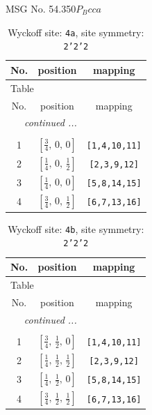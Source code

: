 \documentclass[fleqn,8pt]{jsarticle}
\begin{document}
\setcounter{MaxMatrixCols}{32}

\renewcommand{\tablename}{Table~}
\renewcommand{\figurename}{Figure~}
\begin{center}
\LARGE
MSG No. 54.350\quad$P_{B}cca$
\end{center}
\renewcommand{\arraystretch}{1.2}
\begin{longtable}{ccc}
\caption{Wyckoff site: {\tt 4a}, site symmetry: {\tt 2'2'2}}
 \\
 \hline \hline
No. & position & mapping \\ \hline \endfirsthead

\multicolumn{2}{l}{\tablename\ \thetable{}} \\
 \hline \hline
No. & position & mapping \\ \hline \endhead

 \hline \hline
\multicolumn{2}{r}{\footnotesize\it continued ...} \\ \endfoot

 \hline \hline
\multicolumn{2}{r}{} \\ \endlastfoot

1 & $\left[ \frac{3}{4},\, 0,\, 0 \right]$ & {\tt [1,4,10,11]} \\ \hline
2 & $\left[ \frac{1}{4},\, 0,\, \frac{1}{2} \right]$ & {\tt [2,3,9,12]} \\ \hline
3 & $\left[ \frac{1}{4},\, 0,\, 0 \right]$ & {\tt [5,8,14,15]} \\ \hline
4 & $\left[ \frac{3}{4},\, 0,\, \frac{1}{2} \right]$ & {\tt [6,7,13,16]} \\
\end{longtable}
\renewcommand{\arraystretch}{1.2}
\begin{longtable}{ccc}
\caption{Wyckoff site: {\tt 4b}, site symmetry: {\tt 2'2'2}}
 \\
 \hline \hline
No. & position & mapping \\ \hline \endfirsthead

\multicolumn{2}{l}{\tablename\ \thetable{}} \\
 \hline \hline
No. & position & mapping \\ \hline \endhead

 \hline \hline
\multicolumn{2}{r}{\footnotesize\it continued ...} \\ \endfoot

 \hline \hline
\multicolumn{2}{r}{} \\ \endlastfoot

1 & $\left[ \frac{3}{4},\, \frac{1}{2},\, 0 \right]$ & {\tt [1,4,10,11]} \\ \hline
2 & $\left[ \frac{1}{4},\, \frac{1}{2},\, \frac{1}{2} \right]$ & {\tt [2,3,9,12]} \\ \hline
3 & $\left[ \frac{1}{4},\, \frac{1}{2},\, 0 \right]$ & {\tt [5,8,14,15]} \\ \hline
4 & $\left[ \frac{3}{4},\, \frac{1}{2},\, \frac{1}{2} \right]$ & {\tt [6,7,13,16]} \\
\end{longtable}
\end{document}
